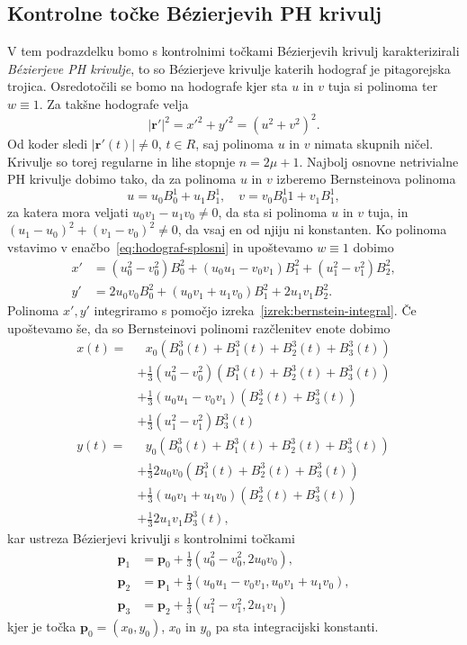 \documentclass[isrm2, tisk]{fmfdelo}
\newcommand{\p}{\mathbf{p}}
\begin{document}
    \subsection{Kontrolne točke Bézierjevih PH krivulj}
    V tem podrazdelku bomo s kontrolnimi točkami Bézierjevih krivulj karakterizirali \textit{Bézierjeve PH krivulje}, to so Bézierjeve krivulje katerih hodograf je pitagorejska trojica.
    Osredotočili se bomo na hodografe kjer sta $u$ in $v$ tuja si polinoma ter $w\equiv 1$.
    Za takšne hodografe velja
    \[|\mathbf{r'}|^2 = x'^2 + y'^2 = (u^2+v^2)^2.\]
    Od koder sledi $|\mathbf{r'}(t)|\neq 0$, $t\in R$, saj polinoma $u$ in $v$ nimata skupnih ničel.
    Krivulje so torej regularne in lihe stopnje $n=2\mu+1$.
    Najbolj osnovne netrivialne PH krivulje dobimo tako, da za polinoma $u$ in $v$ izberemo Bernsteinova polinoma
    \[u=u_0B_{0}^{1}+u_1B_{1}^{1},\quad v=v_0B^1_{0}{1}+v_1B_{1}^{1},\]
    za katera mora veljati $u_0v_1-u_1v_0\neq 0$, da sta si polinoma $u$ in $v$ tuja, in $(u_1-u_0)^2+(v_1-v_0)^2\neq 0$, da vsaj en od njiju ni konstanten.
    Ko polinoma vstavimo v enačbo~\eqref{eq:hodograf-splosni} in upoštevamo $w\equiv 1$ dobimo
    \begin{align*}
        x' &=(u_0^2-v_0^2)B_{0}^{2}+(u_0u_1-v_0v_1)B_{1}^{2} + (u_1^2-v_1^2)B_{2}^{2},\\
        y' &= 2u_0 v_0 B_{0}^{2}+(u_0v_1+u_1v_0)B_{1}^{2}+2u_1 v_1 B_{2}^{2}.
    \end{align*}
    Polinoma $x',y'$ integriramo s pomočjo izreka~\ref{izrek:bernstein-integral}.
    Če upoštevamo še, da so Bernsteinovi polinomi razčlenitev enote dobimo
    \begin{align*}
        x(t) = &\ \ \ x_0(B_{0}^{3}(t) + B_{1}^{3}(t) + B_{2}^{3}(t)+ B_{3}^{3}(t)) \\
        &+ \frac{1}{3}(u_0^2-v_0^2)(B_{1}^{3}(t) + B_{2}^{3}(t)+ B_{3}^{3}(t)) \\
        &+ \frac{1}{3}(u_0u_1-v_0v_1)(B_{2}^{3}(t)+ B_{3}^{3}(t)) \\
        &+ \frac{1}{3} (u_1^2-v_1^2)B_{3}^{3}(t)\\
        y(t) = &\ \ \  y_0(B_{0}^{3}(t) + B_{1}^{3}(t) + B_{2}^{3}(t)+ B_{3}^{3}(t)) \\
        &+ \frac{1}{3}2u_0 v_0(B_{1}^{3}(t) + B_{2}^{3}(t)+ B_{3}^{3}(t)) \\
        &+ \frac{1}{3}(u_0v_1+u_1v_0)(B_{2}^{3}(t)+ B_{3}^{3}(t)) \\
        &+ \frac{1}{3} 2u_1 v_1 B_{3}^{3}(t),
    \end{align*}
    kar ustreza Bézierjevi krivulji s kontrolnimi točkami
    \begin{align}
        \p_1 &=\p_0+\frac{1}{3}(u_0^2-v_0^2,2u_0v_0), \nonumber\\
        \p_2 &= \p_1+\frac{1}{3}(u_0u_1-v_0v_1, u_0v_1+u_1v_0),\nonumber\\
        \p_3 &= \p_2 + \frac{1}{3}(u_1^2-v_1^2, 2u_1v_1) \label{eq:ph-kontrolne}
    \end{align}
    kjer je točka $\p_0=(x_0,y_0)$, $x_0$ in $y_0$ pa sta integracijski konstanti.
\end{document}
